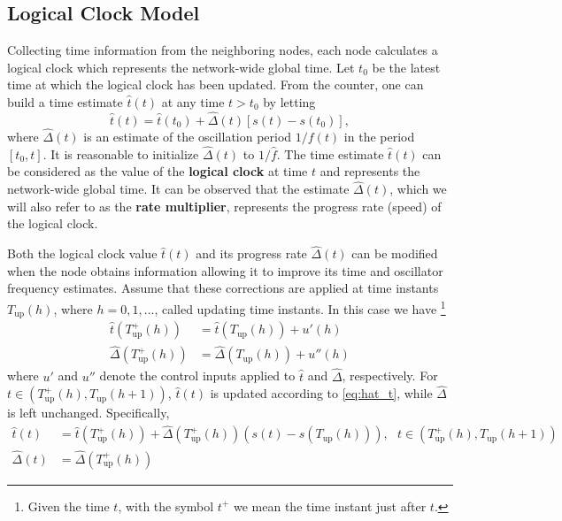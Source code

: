 \documentclass[english,a4paper,10pt,final]{article}
\numberwithin{equation}{section}
\numberwithin{figure}{section}
\begin{document}
\subsection{Logical Clock Model}

Collecting time information from the neighboring nodes, each node calculates a logical clock which represents the network-wide global time. Let $t_0$ be the latest time at which the logical clock has been updated. From the counter, one can build a time estimate $\hat{t}(t)$ at any time $t>t_0$ by letting
\begin{equation}
  \label{eq:hat_t}
  \hat{t}(t) = \hat{t}(t_0) + \hat{\Delta}(t)[s(t)-s(t_0)], 
\end{equation}
where $\hat{\Delta}(t)$ is an estimate of the oscillation period $1/f(t)$ in the period $[t_0, t]$. It is reasonable to initialize $\hat{\Delta}(t)$ to $1/\hat{f}$. The time estimate $\hat{t}(t)$ can be considered as the value of the \textbf{logical clock} at time $t$ and represents the network-wide global time. It can be observed that the estimate  $\hat{\Delta}(t)$, which we will also refer to as the \textbf{rate multiplier}, represents the progress rate (speed) of the logical clock.

Both the logical clock value $\hat{t}(t)$ and its progress rate $\hat{\Delta}(t)$ can be modified when the node obtains information allowing it to improve its time and oscillator frequency estimates. Assume that these corrections are applied at time instants $T_\mathrm{up}(h)$, where $h=0,1,\dots$, called updating time instants. In this case we have \footnote{Given the time $t$, with the symbol $t^+$ we mean the time instant just after $t$.}
\begin{align*}
    \hat{t}(T_\mathrm{up}^+(h))& = \hat{t}(T_\mathrm{up}(h)) + u'(h) \\
    \hat{\Delta}(T_\mathrm{up}^+(h))& = \hat{\Delta}(T_\mathrm{up}(h)) + u''(h)
\end{align*}
where $u'$ and $u''$ denote the control inputs applied to $\hat{t}$ and $\hat{\Delta}$, respectively. For $t\in\left(T_\mathrm{up}^+(h), T_\mathrm{up}(h+1)\right)$, $ \hat{t}(t)$ is updated according to \eqref{eq:hat_t}, while $\hat{\Delta}$ is left unchanged. Specifically,
\begin{align}
  \label{eq:Update}
    \hat{t}(t)& = \hat{t}(T_\mathrm{up}^+(h)) + \hat{\Delta}(T_\mathrm{up}^+(h)) \left(s(t)-s(T_\mathrm{up}(h))\right), \ \ \ t\in\left(T_\mathrm{up}^+(h), T_\mathrm{up}(h+1)\right)
\nonumber \\
    \hat{\Delta}(t)&=\hat{\Delta}(T_\mathrm{up}^+(h))\end{align}
\end{document}
